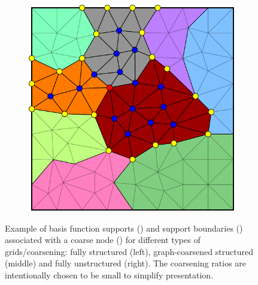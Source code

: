 \begin{figure}[htbp]
\begin{subfigure}[t]{0.3\textwidth}
  \end{subfigure}
  \hfill
  \begin{subfigure}[t]{0.3\textwidth}
    \centerline{\includegraphics[width=0.9\linewidth]{figs/square/square_tria_metis_node_supp}}
  \end{subfigure}
  \caption[Nodal basis function support grid examples]{\label{fig:square_node_supp} Example of basis function supports () and support boundaries () associated with a coarse node () for different types of grids/coarsening: fully structured (left), graph-coarsened structured (middle) and fully unstructured (right).   The coarsening ratios are intentionally chosen to be small to simplify presentation.}
\end{figure}

